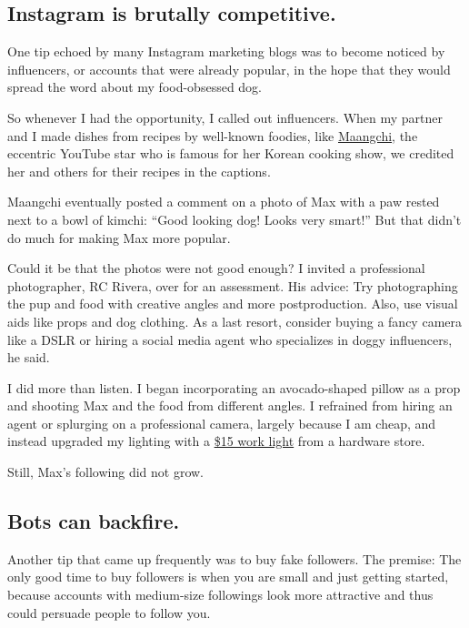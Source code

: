 \hypertarget{instagram-is-brutally-competitive}{%
\subsection{Instagram is brutally
competitive.}\label{instagram-is-brutally-competitive}}

One tip echoed by many Instagram marketing blogs was to become noticed
by influencers, or accounts that were already popular, in the hope that
they would spread the word about my food-obsessed dog.

So whenever I had the opportunity, I called out influencers. When my
partner and I made dishes from recipes by well-known foodies, like
\href{https://www.youtube.com/user/Maangchi}{Maangchi}, the eccentric
YouTube star who is famous for her Korean cooking show, we credited her
and others for their recipes in the captions.

Maangchi eventually posted a comment on a photo of Max with a paw rested
next to a bowl of kimchi: ``Good looking dog! Looks very smart!'' But
that didn't do much for making Max more popular.

Could it be that the photos were not good enough? I invited a
professional photographer, RC Rivera, over for an assessment. His
advice: Try photographing the pup and food with creative angles and more
postproduction. Also, use visual aids like props and dog clothing. As a
last resort, consider buying a fancy camera like a DSLR or hiring a
social media agent who specializes in doggy influencers, he said.

I did more than listen. I began incorporating an avocado-shaped pillow
as a prop and shooting Max and the food from different angles. I
refrained from hiring an agent or splurging on a professional camera,
largely because I am cheap, and instead upgraded my lighting with a
\href{https://www.youtube.com/watch?v=rnFmBzVTtRs}{\$15 work light} from
a hardware store.

Still, Max's following did not grow.

\hypertarget{bots-can-backfire}{%
\subsection{Bots can backfire.}\label{bots-can-backfire}}

Another tip that came up frequently was to buy fake followers. The
premise: The only good time to buy followers is when you are small and
just getting started, because accounts with medium-size followings look
more attractive and thus could persuade people to follow you.

